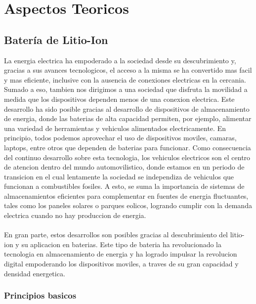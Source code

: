 \documentclass[10pt,a4paper]{article}
\begin{document}
	\clearpage
	
    \section{Aspectos Teoricos}
	
	\subsection{Batería de Litio-Ion}
    
    \noindent La energia electrica ha empoderado a la sociedad desde su 
    descubrimiento y, gracias a sus avances tecnologicos, el acceso a la misma 
    se ha convertido mas facil y mas eficiente, inclusive con la
    ausencia de conexiones electricas en la cercania. Sumado a eso, tambien
    nos dirigimos a una sociedad que disfruta la movilidad a medida que los
    dispositivos dependen menos de una conexion electrica.
    Este desarrollo ha sido posible gracias al desarrollo de dispositivos de 
    almacenamiento de energia, donde las baterias de alta
    capacidad permiten, por ejemplo, alimentar una variedad de herramientas y vehiculos
    alimentados electricamente. En principio, todos podemos aprovechar el uso de
    dispositivos moviles, camaras, laptops, entre otros que dependen de baterias
    para funcionar. Como consecuencia del continuo desarrollo
    sobre esta tecnologia, los vehiculos electricos son el centro de atencion
    dentro del mundo automovilistico, donde estamos en un periodo de transicion
    en el cual lentamente la sociedad se independiza de vehiculos que funcionan
    a combustibles fosiles. A esto, se suma la importancia de sistemas de
    almacenamientos eficientes para complementar en fuentes de energia
    fluctuantes, tales como los paneles solares o parques eolicos, logrando
    cumplir con la demanda electrica cuando no hay produccion de energia.\\
    \\
    \noindent En gran parte, estos desarrollos son posibles gracias al
    descubrimiento del litio-ion y su aplicacion en baterias. Este tipo de
    bateria ha revolucionado la tecnologia en almacenamiento de energia y ha
    logrado impulsar la revolucion digital empoderando los dispositivos moviles,
    a traves de su gran capacidad y densidad energetica.

    \subsubsection{Principios basicos}
\end{document}
